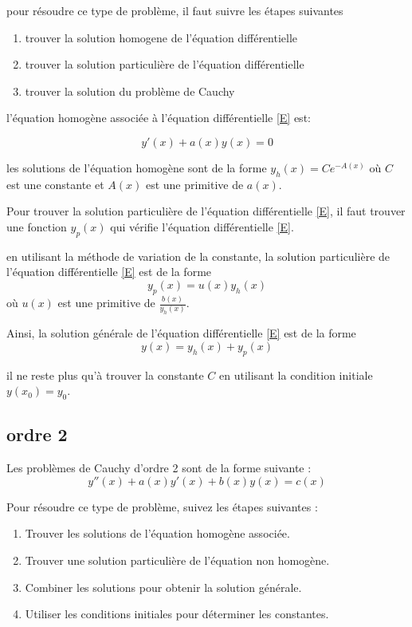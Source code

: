 \documentclass{article}
\begin{document}
pour résoudre ce type de problème, il faut suivre les étapes suivantes

\begin{enumerate}
    \item trouver la solution homogene de l'équation différentielle
    \item trouver la solution particulière de l'équation différentielle
    \item trouver la solution du problème de Cauchy
\end{enumerate}

l'équation homogène associée à l'équation différentielle \eqref{E} est:

\begin{equation}\tag{H}
    y'(x) + a(x)y(x) = 0
\end{equation}

les solutions de l'équation homogène sont de la forme $y_h(x) = Ce^{-A(x)}$ où $C$ est une constante et $A(x)$ est une primitive de $a(x)$.

Pour trouver la solution particulière de l'équation différentielle \eqref{E}, il faut trouver une fonction $y_p(x)$ qui vérifie l'équation différentielle \eqref{E}.

en utilisant la méthode de variation de la constante,
la solution particulière de l'équation différentielle \eqref{E} est de la forme 
\begin{equation*}
    y_p(x) = u(x)y_h(x)
\end{equation*}
où $u(x)$ est une primitive de $\frac{b(x)}{y_h(x)}$.

Ainsi, la solution générale de l'équation différentielle \eqref{E} est de la forme
\begin{equation*}
    y(x) = y_h(x) + y_p(x)
\end{equation*}

il ne reste plus qu'à trouver la constante $C$ en utilisant la condition initiale $y(x_0) = y_0$.

\subsection{ordre 2}
Les problèmes de Cauchy d'ordre 2 sont de la forme suivante :
\begin{equation}
    y''(x) + a(x)y'(x) + b(x)y(x) = c(x)
\end{equation}

Pour résoudre ce type de problème, suivez les étapes suivantes :
\begin{enumerate}
    \item Trouver les solutions de l'équation homogène associée.
    \item Trouver une solution particulière de l'équation non homogène.
    \item Combiner les solutions pour obtenir la solution générale.
    \item Utiliser les conditions initiales pour déterminer les constantes.
\end{enumerate}
\end{document}
